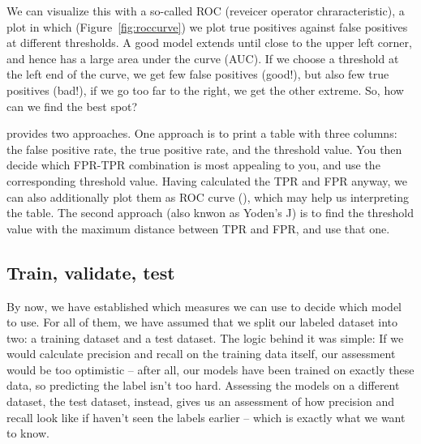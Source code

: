 We can visualize this with a so-called ROC (reveicer operator
chraracteristic), a plot in which (Figure~\ref{fig:roccurve}) we plot
true positives against false positives at different thresholds.  A
good model extends until close to the upper left corner, and hence has
a large area under the curve (AUC).  If we choose a threshold at the
left end of the curve, we get few false positives (good!), but also
few true positives (bad!), if we go too far to the right, we get
the other extreme. So, how can we find the best spot?

 provides two approaches. One approach is to print a table with three columns: the false
positive rate, the true positive rate, and the threshold value. You
then decide which FPR-TPR combination is most appealing to you, and
use the corresponding threshold value. Having calculated the TPR and FPR anyway, we can
also additionally plot them as ROC curve (), which may help
us interpreting the table.
The second approach (also knwon as Yoden's J) is to find the threshold
value with the maximum distance between TPR and FPR, and use that one.






\subsection{Train, validate, test}
\label{sec:train}

By now, we have established which measures we can use to decide which
model to use. For all of them, we have assumed that we split our
labeled dataset into two: a training dataset and a test dataset. The
logic behind it was simple: If we would calculate precision and recall
on the training data itself, our assessment would be too optimistic --
after all, our models have been trained on exactly these data, so
predicting the label isn't too hard. Assessing the models on a different
dataset, the test dataset, instead, gives us an assessment of how
precision and recall look like if haven't seen the labels earlier --
which is exactly what we want to know.

